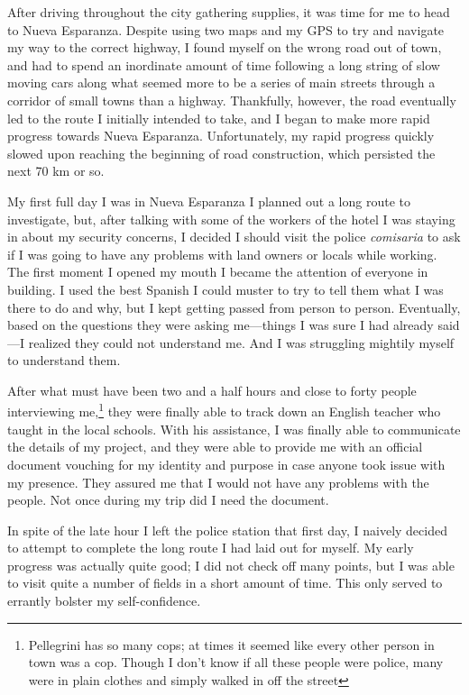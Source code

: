 After driving throughout the city gathering supplies, it was time for me to head to Nueva Esparanza. Despite using two maps and my GPS to try and navigate my way to the correct highway, I found myself on the wrong road out of town, and had to spend an inordinate amount of time following a long string of slow moving cars along what seemed more to be a series of main streets through a corridor of small towns than a highway. Thankfully, however, the road eventually led to the route I initially intended to take, and I began to make more rapid progress towards Nueva Esparanza.
Unfortunately, my rapid progress quickly slowed upon reaching the beginning of road construction, which persisted the next 70 km or so.

My first full day I was in Nueva Esparanza I planned out a long route to investigate, but, after talking with some of the workers of the hotel I was staying in about my security concerns, I decided I should visit the police \textit{comisaria} to ask if I was going to have any problems with land owners or locals while working. The first moment I opened my mouth I became the attention of everyone in building. I used the best Spanish I could muster to try to tell them what I was there to do and why, but I kept getting passed from person to person. Eventually, based on the questions they were asking me—things I was sure I had already said—I realized they could not understand me. And I was struggling mightily myself to understand them.

After what must have been two and a half hours and close to forty people interviewing me,\footnote{Pellegrini has so many cops; at times it seemed like every other person in town was a cop. Though I don't know if all these people were police, many were in plain clothes and simply walked in off the street} they were finally able to track down an English teacher who taught in the local schools. With his assistance, I was finally able to communicate the details of my project, and they were able to provide me with an official document vouching for my identity and purpose in case anyone took issue with my presence. They assured me that I would not have any problems with the people. Not once during my trip did I need the document.

In spite of the late hour I left the police station that first day, I naively decided to attempt to complete the long route I had laid out for myself. My early progress was actually quite good; I did not check off many points, but I was able to visit quite a number of fields in a short amount of time. This only served to errantly bolster my self-confidence.

